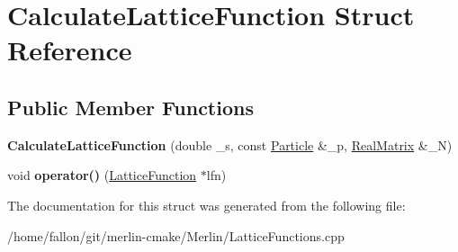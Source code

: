 \hypertarget{structCalculateLatticeFunction}{}\section{Calculate\+Lattice\+Function Struct Reference}
\label{structCalculateLatticeFunction}
\subsection*{Public Member Functions}
\begin{DoxyCompactItemize}
\item 
\mbox{\label{structCalculateLatticeFunction_a84643bd5eef2c2beaa0f0860a958e1be}} 
{\bfseries Calculate\+Lattice\+Function} (double \+\_\+s, const \hyperlink{classPSvector}{Particle} \&\+\_\+p, \hyperlink{classTLAS_1_1Matrix}{Real\+Matrix} \&\+\_\+N)
\item 
\mbox{\label{structCalculateLatticeFunction_a657e6f8fe13799fec595784e1cbee54b}} 
void {\bfseries operator()} (\hyperlink{classLatticeFunction}{Lattice\+Function} $\ast$lfn)
\end{DoxyCompactItemize}


The documentation for this struct was generated from the following file\+:\begin{DoxyCompactItemize}
\item 
/home/fallon/git/merlin-\/cmake/\+Merlin/Lattice\+Functions.\+cpp\end{DoxyCompactItemize}
